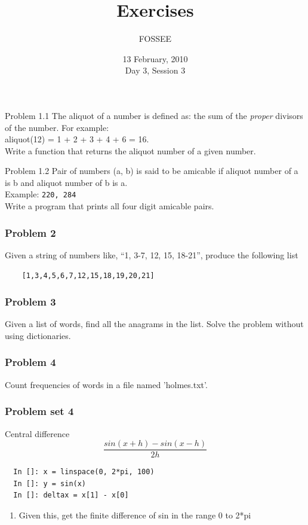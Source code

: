 \documentclass[14pt,compress]{beamer}
\title[Exercises]{Exercises}
\author[FOSSEE] {FOSSEE}
\institute[IIT Bombay] {Department of Aerospace Engineering\\IIT Bombay}
\date[] {13 February, 2010\\Day 3, Session 3}
\newcounter{time}
\newcommand{\inctime}[1]{\addtocounter{time}{#1}{\tiny \thetime\ m}}
\begin{document}
\begin{frame}
  \titlepage
\end{frame}

\begin{frame}{Problem 1.1}
  The aliquot of a number is defined as: the sum of the \emph{proper} divisors of the number. For example:\\
aliquot(12) = 1 + 2 + 3 + 4 + 6 = 16.\\
  Write a function that returns the aliquot number of a given number. 
\end{frame}

\begin{frame}{Problem 1.2}
  Pair of numbers (a, b) is said to be \alert{amicable} if aliquot number of a is b and aliquot number of b is a.\\
  Example: \texttt{220, 284}\\
  Write a program that prints all four digit amicable pairs.
  
\inctime{20}
\end{frame}



\begin{frame}[fragile]
  \frametitle{Problem 2}
  Given a string of numbers like, ``1, 3-7, 12, 15, 18-21'', produce the following list \\
  \begin{lstlisting}
    [1,3,4,5,6,7,12,15,18,19,20,21]
  \end{lstlisting}
\inctime{10}
\end{frame}


\begin{frame}
  \frametitle{Problem 3}
Given a list of words, find all the anagrams in the list.
Solve the problem without using dictionaries.

\end{frame}

\begin{frame} 
  \frametitle{Problem 4}
  Count frequencies of words in a file named 'holmes.txt'.
\inctime{25}
\end{frame}

\begin{frame}[fragile]
  \frametitle{Problem set 4}
  Central difference
  \begin{equation*}
  \frac{sin(x+h)-sin(x-h)}{2h}
  \end{equation*}
  \begin{lstlisting}
  In []: x = linspace(0, 2*pi, 100)
  In []: y = sin(x)
  In []: deltax = x[1] - x[0]
  \end{lstlisting}
  \pause
    \begin{enumerate}
      \item Given this, get the finite difference of sin in the range 0 to 2*pi
    \end{enumerate}
\end{frame}
\end{document}
